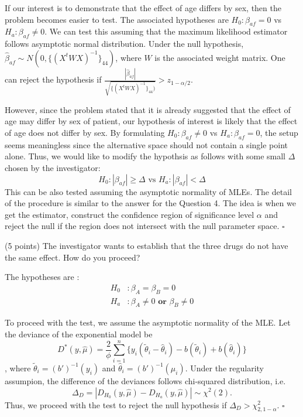 \documentclass[11pt]{article}
\newcommand{\0}{{\mathbf{0}}}
\newcommand{\1}{{\mathbf{1}}}
\newcommand{\pr}[1]{\noindent{\bf #1.}}
\newcommand{\so}{\noindent{\textsc{Solution.\;\;}}}
\newcommand{\ed}{\hfill$\square$}
\begin{document}
\so

If our interest is to demonstrate that the effect of age differs by sex, then the problem becomes easier to test. The associated hypotheses are $H_0 : \beta_{af} = 0 $ vs $H_a : \beta_{af} \neq 0 $. We can test this assuming that the maximum likelihood estimator follows asymptotic normal distribution. Under the null hypothesis, $\hat{\beta}_{af} \sim N( 0 , \{(X^t WX)^{-1}\}_{44})$, where $W$ is the associated weight matrix. One can reject the hypothesis if $\frac{|\hat{\beta}_{af}|}{\sqrt{\{(X^t WX)^{-1}\}_{44})}} > z_{1-\alpha/2} $.

However, since the problem stated that it is already suggested that the effect of age may differ by sex of patient, our hypothesis of interest is likely that the effect of age does not differ by sex. By formulating $H_0 : \beta_{af} \neq 0 $ vs $H_a : \beta_{af} = 0 $, the setup seems meaningless since the alternative space should not contain a single point alone. Thus, we would like to modify the hypothsis as follows with some small $\Delta$ chosen by the investigator:
$$
H_0 : |\beta_{af}| \ge \Delta \text{ vs } H_a : |\beta_{af}| < \Delta 
$$
This can be also tested assuming the asymptotic normality of MLEs. The detail of the procedure is similar to the answer for the Question 4. The idea is when we get the estimator, construct the confidence region of significance level $\alpha$ and reject the null if the region does not intersect with the null parameter space.
\ed


\pr{3} (5 points) The investigator wants to establish that the three drugs do not have the same effect. How do you proceed?

\so

The hypotheses are :
\begin{align*}
H_0 &: \beta_A = \beta_B = 0 \\
H_a &: \beta_A \neq 0 \textbf{ or } \beta_B \neq 0
\end{align*}

To proceed with the test, we assume the asymptotic normality of the MLE. Let the deviance of the exponential model be 
$$
D^*(y, \hat{\mu}) = \frac{2}{\phi}\sum_{i=1}^n\{y_i (\tilde{\theta}_i - \hat{\theta}_i) - b(\tilde{\theta}_i) + b(\hat{\theta}_i) \}
$$
, where $\tilde{\theta}_i = (b')^{-1}(y_i)$ and $\hat{\theta}_i = (b')^{-1}(\mu_i)$. Under the regularity assumpion, the difference of the deviances follows chi-squared distribution, i.e. $$\Delta_D = |D_{H_0}(y, \hat{\mu}) - D_{H_a}(y, \hat{\mu})| \sim \chi^2(2).$$
Thus, we proceed with the test to reject the null hypothesis if $\Delta_D > \chi^2_{2,1-\alpha}$.
\ed
\end{document}
